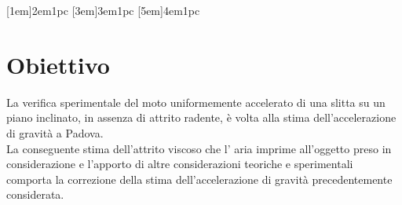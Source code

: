 \documentclass[a4paper,11pt,oneside]{article}
\begin{document}


\tableofcontents
{}
\contentsmargin{6em}
[1em]{\bigskip}{2em}{1pc}
[3em]{\smallskip}{3em}{1pc}
[5em]{\smallskip}{4em}{1pc}


\newpage

\section{Obiettivo}
La verifica sperimentale del moto uniformemente accelerato di una slitta su un piano inclinato, in assenza di attrito radente, è volta alla stima dell'accelerazione  di gravità a Padova.\\
La conseguente stima dell'attrito viscoso che l' aria imprime all'oggetto preso in considerazione e l'apporto di altre considerazioni teoriche e sperimentali comporta la correzione della stima dell’accelerazione di gravità precedentemente considerata.



\end{document}
